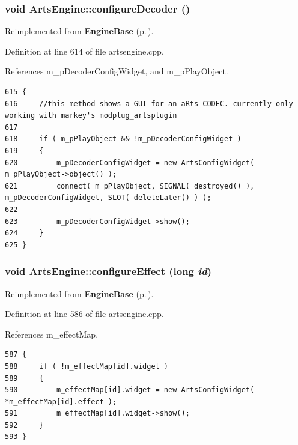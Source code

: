 \subsubsection{\setlength{\rightskip}{0pt plus 5cm}void Arts\-Engine::configure\-Decoder ()\hspace{0.3cm}{\tt  [virtual, slot]}}\label{classArtsEngine_ArtsEnginei6}




Reimplemented from {\bf Engine\-Base} {\rm (p.\,\pageref{classEngineBase_EngineBasei6})}.

Definition at line 614 of file artsengine.cpp.

References m\_\-p\-Decoder\-Config\-Widget, and m\_\-p\-Play\-Object.



\footnotesize\begin{verbatim}615 {
616     //this method shows a GUI for an aRts CODEC. currently only working with markey's modplug_artsplugin
617 
618     if ( m_pPlayObject && !m_pDecoderConfigWidget )
619     {
620         m_pDecoderConfigWidget = new ArtsConfigWidget( m_pPlayObject->object() );
621         connect( m_pPlayObject, SIGNAL( destroyed() ), m_pDecoderConfigWidget, SLOT( deleteLater() ) );
622 
623         m_pDecoderConfigWidget->show();
624     }
625 }
\end{verbatim}\normalsize 
{}
\subsubsection{\setlength{\rightskip}{0pt plus 5cm}void Arts\-Engine::configure\-Effect (long {\em id})\hspace{0.3cm}{\tt  [virtual]}}\label{classArtsEngine_ArtsEnginea16}




Reimplemented from {\bf Engine\-Base} {\rm (p.\,\pageref{classEngineBase_EngineBasea22})}.

Definition at line 586 of file artsengine.cpp.

References m\_\-effect\-Map.



\footnotesize\begin{verbatim}587 {
588     if ( !m_effectMap[id].widget )
589     {
590         m_effectMap[id].widget = new ArtsConfigWidget( *m_effectMap[id].effect );
591         m_effectMap[id].widget->show();
592     }
593 }
\end{verbatim}\normalsize 
{}
